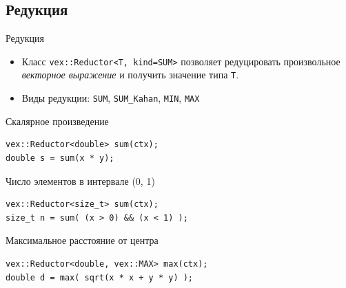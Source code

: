 \documentclass[@BEAMER_OPTIONS@]{beamer}
\newcommand{\code}[1]{\lstinline|#1|}
\begin{document}
\subsection{Редукция}

\begin{frame}[fragile]{Редукция}
    \begin{itemize}
        \item Класс \code{vex::Reductor<T, kind=SUM>} позволяет редуцировать
            произвольное \emph{векторное выражение} и получить значение типа
            \code{T}.
        \item Виды редукции: \code{SUM}, \code{SUM_Kahan}, \code{MIN},
            \code{MAX}
    \end{itemize}
    \begin{exampleblock}{Скалярное произведение}
        \begin{lstlisting}
vex::Reductor<double> sum(ctx);
double s = sum(x * y);
        \end{lstlisting}
    \end{exampleblock}
    \begin{exampleblock}{Число элементов в интервале (0, 1)}
        \begin{lstlisting}
vex::Reductor<size_t> sum(ctx);
size_t n = sum( (x > 0) && (x < 1) );
        \end{lstlisting}
    \end{exampleblock}
    \begin{exampleblock}{Максимальное расстояние от центра}
        \begin{lstlisting}
vex::Reductor<double, vex::MAX> max(ctx);
double d = max( sqrt(x * x + y * y) );
        \end{lstlisting}
    \end{exampleblock}
\end{frame}

\end{document}
